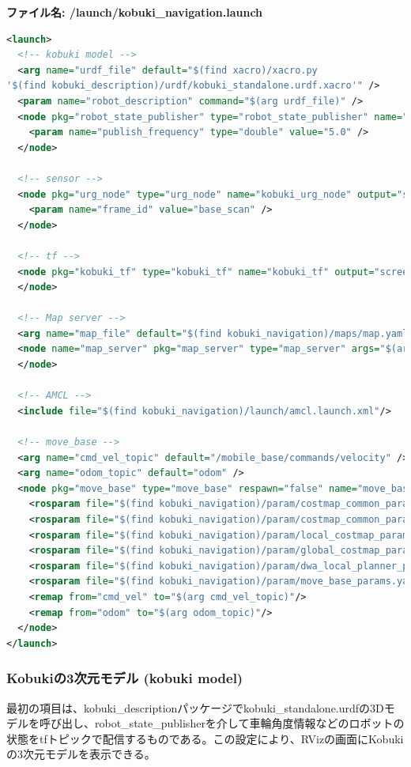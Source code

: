 \textbf{ファイル名: /launch/kobuki\_navigation.launch}
\begin{lstlisting}[language=XML]
<launch>
  <!-- kobuki model -->
  <arg name="urdf_file" default="$(find xacro)/xacro.py
'$(find kobuki_description)/urdf/kobuki_standalone.urdf.xacro'" />
  <param name="robot_description" command="$(arg urdf_file)" />
  <node pkg="robot_state_publisher" type="robot_state_publisher" name="robot_state_publisher" output="screen">
    <param name="publish_frequency" type="double" value="5.0" />
  </node>

  <!-- sensor -->
  <node pkg="urg_node" type="urg_node" name="kobuki_urg_node" output="screen">
    <param name="frame_id" value="base_scan" />
  </node>

  <!-- tf -->
  <node pkg="kobuki_tf" type="kobuki_tf" name="kobuki_tf" output="screen">
  </node>

  <!-- Map server -->
  <arg name="map_file" default="$(find kobuki_navigation)/maps/map.yaml"/>
  <node name="map_server" pkg="map_server" type="map_server" args="$(arg map_file)">
  </node>

  <!-- AMCL -->
  <include file="$(find kobuki_navigation)/launch/amcl.launch.xml"/>

  <!-- move_base -->
  <arg name="cmd_vel_topic" default="/mobile_base/commands/velocity" />
  <arg name="odom_topic" default="odom" />
  <node pkg="move_base" type="move_base" respawn="false" name="move_base" output="screen">
    <rosparam file="$(find kobuki_navigation)/param/costmap_common_params.yaml" command="load" ns="global_costmap" />
    <rosparam file="$(find kobuki_navigation)/param/costmap_common_params.yaml" command="load" ns="local_costmap" />
    <rosparam file="$(find kobuki_navigation)/param/local_costmap_params.yaml" command="load" />
    <rosparam file="$(find kobuki_navigation)/param/global_costmap_params.yaml" command="load" />
    <rosparam file="$(find kobuki_navigation)/param/dwa_local_planner_params.yaml" command="load" />
    <rosparam file="$(find kobuki_navigation)/param/move_base_params.yaml" command="load" />
    <remap from="cmd_vel" to="$(arg cmd_vel_topic)"/>
    <remap from="odom" to="$(arg odom_topic)"/>
  </node>
</launch>
\end{lstlisting}

\subsubsection{Kobukiの3次元モデル (kobuki model)}

最初の項目は、kobuki\_descriptionパッケージでkobuki\_standalone.urdfの3Dモデルを呼び出し、robot\_state\_publisherを介して車輪角度情報などのロボットの状態をtfトピックで配信するものである。この設定により、RVizの画面にKobukiの3次元モデルを表示できる。

